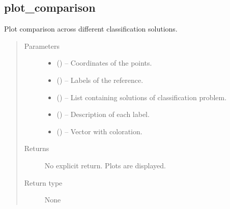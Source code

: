 \documentclass[letterpaper,10pt,english]{sphinxmanual}
\begin{document}
\subsection{plot\_comparison}
\label{\detokenize{api/ucf.plot_comparison:plot-comparison}}\label{\detokenize{api/ucf.plot_comparison::doc}}

\begin{fulllineitems}
\label{\detokenize{api/ucf.plot_comparison:ucf.plot_comparison}}
Plot comparison across different classification solutions.
\begin{quote}\begin{description}
\item[{Parameters}] \leavevmode\begin{itemize}
\item {} 
 () -- Coordinates of the points.

\item {} 
 () -- Labels of the reference.

\item {} 
 () -- List containing solutions of classification problem.

\item {} 
 () -- Description of each label.

\item {} 
 () -- Vector with coloration.

\end{itemize}

\item[{Returns}] \leavevmode
No explicit return. Plots are displayed.

\item[{Return type}] \leavevmode
None

\end{description}\end{quote}

\end{fulllineitems}
\end{document}
